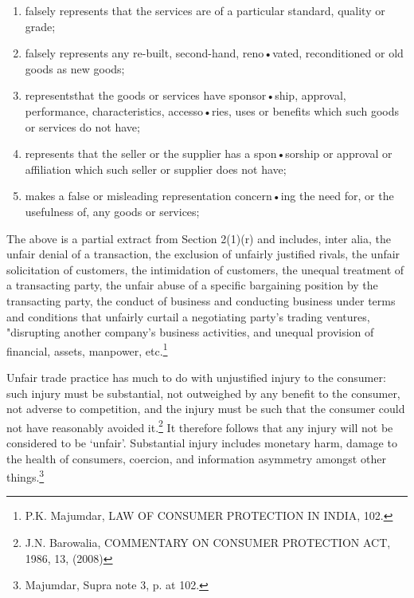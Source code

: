 \begin{multicols}{2}
{\begin{enumerate}[label=(\roman*)]
\item falsely represents that the services are of a particular standard, quality or grade;

\item falsely represents any re-built, second-hand, reno•vated, reconditioned or old goods as new goods;

\item representsthat the goods or services have sponsor•ship, approval, performance, characteristics,
accesso•ries, uses or benefits which such goods or services do not have;

\item represents that the seller or the supplier has a spon•sorship or approval or affiliation which such seller or
supplier does not have;

\item makes a false or misleading representation concern•ing the need for, or the usefulness of, any goods or services;
\end{enumerate}}

\vspace{-.15cm}

\noi
The above is a partial extract from Section 2(1)(r) and includes, inter alia, the unfair denial of
a transaction, the exclusion of unfairly justified rivals, the unfair solicitation of customers, the
intimidation of customers, the unequal treatment of a transacting party, the unfair abuse of a
specific bargaining position by the transacting party, the conduct of business and conducting
business under terms and conditions that unfairly curtail a negotiating party's trading ventures, "disrupting another company's business activities, and unequal provision of financial, assets,
manpower, etc.\footnote{P.K. Majumdar, LAW OF CONSUMER PROTECTION IN INDIA, 102.}

\vspace{-.15cm}

\noi
Unfair trade practice has much to do with unjustified injury to the consumer: such injury must
be substantial, not outweighed by any benefit to the consumer, not adverse to competition, and
the injury must be such that the consumer could not have reasonably avoided it.\footnote{J.N. Barowalia, COMMENTARY ON CONSUMER PROTECTION ACT, 1986, 13, (2008)} It therefore follows that any injury will not be considered to be ‘unfair’. Substantial injury includes monetary harm, damage to the health of consumers, coercion, and information asymmetry amongst other things.\footnote{Majumdar, Supra note 3, p. at 102.}


\end{multicols}
